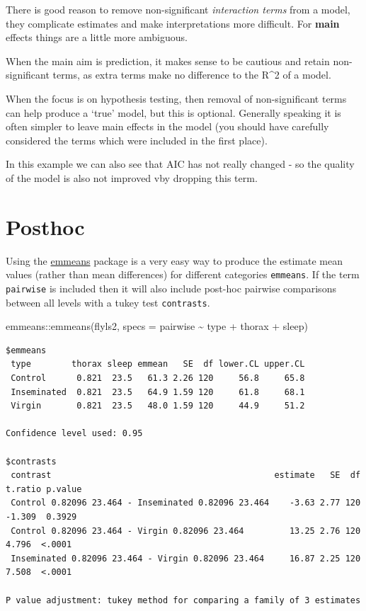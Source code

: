 \documentclass[
]{book}
\newenvironment{Shaded}{\begin{snugshade}}{\end{snugshade}}
\newcommand{\AttributeTok}[1]{\textcolor[rgb]{0.77,0.63,0.00}{#1}}
\newcommand{\FunctionTok}[1]{\textcolor[rgb]{0.00,0.00,0.00}{#1}}
\newcommand{\NormalTok}[1]{#1}
\newcommand{\SpecialCharTok}[1]{\textcolor[rgb]{0.00,0.00,0.00}{#1}}
\begin{document}
There is good reason to remove non-significant \emph{interaction terms} from a model, they complicate estimates and make interpretations more difficult. For \textbf{main} effects things are a little more ambiguous.

When the main aim is prediction, it makes sense to be cautious and retain non-significant terms, as extra terms make no difference to the R\^{}2 of a model.

When the focus is on hypothesis testing, then removal of non-significant terms can help produce a `true' model, but this is optional. Generally speaking it is often simpler to leave main effects in the model (you should have carefully considered the terms which were included in the first place).

In this example we can also see that AIC has not really changed - so the quality of the model is also not improved vby dropping this term.

\hypertarget{posthoc}{%
\section{Posthoc}\label{posthoc}}

Using the \href{https://aosmith.rbind.io/2019/03/25/getting-started-with-emmeans/}{emmeans} package is a very easy way to produce the estimate mean values (rather than mean differences) for different categories \texttt{emmeans}. If the term \texttt{pairwise} is included then it will also include post-hoc pairwise comparisons between all levels with a tukey test \texttt{contrasts}.

\begin{Shaded}
\begin{Highlighting}[]
\NormalTok{emmeans}\SpecialCharTok{::}\FunctionTok{emmeans}\NormalTok{(flyls2, }\AttributeTok{specs =}\NormalTok{ pairwise }\SpecialCharTok{\textasciitilde{}}\NormalTok{ type }\SpecialCharTok{+}\NormalTok{ thorax }\SpecialCharTok{+}\NormalTok{ sleep)}
\end{Highlighting}
\end{Shaded}

\begin{verbatim}
$emmeans
 type        thorax sleep emmean   SE  df lower.CL upper.CL
 Control      0.821  23.5   61.3 2.26 120     56.8     65.8
 Inseminated  0.821  23.5   64.9 1.59 120     61.8     68.1
 Virgin       0.821  23.5   48.0 1.59 120     44.9     51.2

Confidence level used: 0.95 

$contrasts
 contrast                                            estimate   SE  df t.ratio p.value
 Control 0.82096 23.464 - Inseminated 0.82096 23.464    -3.63 2.77 120 -1.309  0.3929 
 Control 0.82096 23.464 - Virgin 0.82096 23.464         13.25 2.76 120  4.796  <.0001 
 Inseminated 0.82096 23.464 - Virgin 0.82096 23.464     16.87 2.25 120  7.508  <.0001 

P value adjustment: tukey method for comparing a family of 3 estimates 
\end{verbatim}
\end{document}
